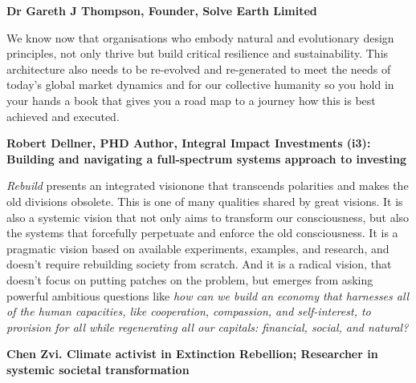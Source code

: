  {\raggedleft \textemdash \textbf{Dr Gareth J Thompson, Founder, Solve Earth Limited}}
\vspace{1.5ex}




\noindent We know now that organisations who embody natural and evolutionary design principles, not only thrive but build critical resilience and sustainability. 
This architecture also needs to be re-evolved and re-generated to meet the needs of today's global market dynamics and for our collective humanity so you hold in your hands a book that gives you a road map to a journey how this is best achieved and executed. 


{\raggedleft \textemdash \textbf{Robert Dellner, PHD
Author, Integral Impact Investments (i3): Building and navigating a full-spectrum systems approach to investing}}
\vspace{1.5ex}


\noindent \emph{Rebuild} presents an integrated vision\textemdash one that transcends polarities and makes the old divisions obsolete. This is one of many qualities shared by great visions. It is also a systemic vision that not only aims to transform our consciousness, but also the systems that forcefully perpetuate and enforce the old consciousness. It is a pragmatic vision based on available experiments, examples, and research, and doesn't require rebuilding society from scratch. And it is a radical vision, that doesn't focus on putting patches on the problem, but emerges from asking powerful ambitious questions like \emph{how can we build an economy that harnesses all of the human capacities, like cooperation, compassion, and self-interest, to provision for all while regenerating all our capitals: financial, social, and  natural?}


{\raggedleft \textemdash \textbf{Chen Zvi. Climate activist in Extinction Rebellion;
Researcher in systemic societal transformation}}
\vspace{1.5ex}




